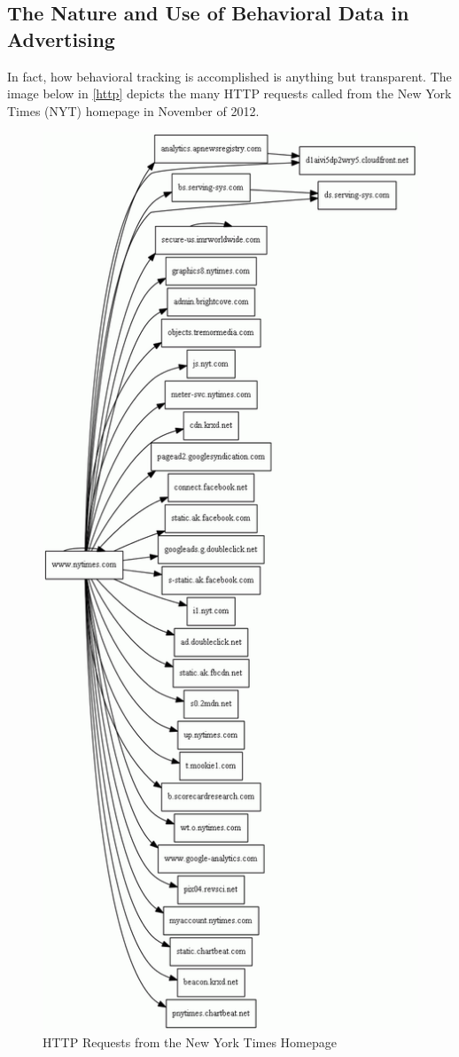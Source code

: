 \subsection{The Nature and Use of Behavioral Data in Advertising}
\label{thenatureanduseofbehavioraldatainadvertising}

In fact, how behavioral tracking is accomplished is anything but transparent. The image below in  \autoref{http}  depicts the many HTTP requests called from the New York Times (NYT) homepage in November of 2012. 


\begin{figure}
\centerline{
  \includegraphics{chapter2.tex/Image1}
  }
\caption{HTTP Requests from the New York Times Homepage}
\label{http}
\end{figure}


